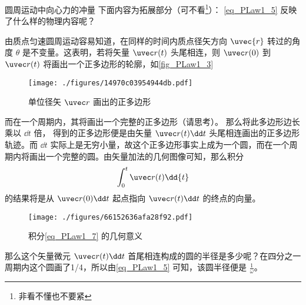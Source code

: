 \begin{example}{圆周运动中向心力的冲量}
下面内容为拓展部分（可不看\footnote{非看不懂也不要紧}）：
\autoref{eq_PLaw1_5} 反映了什么样的物理内容呢？

由质点匀速圆周运动容易知道，在同样的时间内质点径矢方向 $\uvec{r}$ 转过的角度 $\theta$ 是不变量。这表明，若将矢量 $\uvec r(t)$ 头尾相连，则 $\uvec r(0)$ 到 $\uvec r(t)$ 将画出一个正多边形的轮廓，如\autoref{fig_PLaw1_3} 
\begin{figure}[ht]
\centering
\texttt{[image: ./figures/14970c03954944db.pdf]}
\caption{单位径矢 $\uvec r$ 画出的正多边形} \label{fig_PLaw1_3}
\end{figure}
而在一个周期内，其将画出一个完整的正多边形（请思考）。
那么将此多边形边长乘以 $\dd t$ 倍， 得到的正多边形便是由矢量 $\uvec r(t)\dd t$ 头尾相连画出的正多边形轨迹。而 $\dd t$ 实际上是无穷小量，故这个正多边形事实上成为一个圆，而在一个周期内将画出一个完整的圆。由矢量加法的几何图像可知，那么积分
\begin{equation}\label{eq_PLaw1_7}
\int_{0}^{t}\uvec r(t) \dd{t}
\end{equation}
的结果将是从 $\uvec r(0)\dd t$ 起点指向 $\uvec r(t)\dd t$ 的终点的向量。
\begin{figure}[ht]
\centering
\texttt{[image: ./figures/66152636afa28f92.pdf]}
\caption{积分\autoref{eq_PLaw1_7} 的几何意义} \label{fig_PLaw1_4}
\end{figure}
那么这个矢量微元 $\uvec r(t)\dd t$ 首尾相连构成的圆的半径是多少呢？在四分之一周期内这个圆画了1/4，所以由\autoref{eq_PLaw1_5} 可知，该圆半径便是 $\frac{1}{\omega}$。
\end{example}
